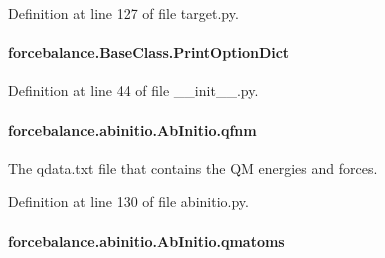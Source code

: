 Definition at line 127 of file target.\-py.

\hypertarget{classforcebalance_1_1BaseClass_afc6659278497d7245bc492ecf405ccae}{
\paragraph[{Print\-Option\-Dict}]{\setlength{\rightskip}{0pt plus 5cm}forcebalance.\-Base\-Class.\-Print\-Option\-Dict\hspace{0.3cm}{\ttfamily [inherited]}}}\label{classforcebalance_1_1BaseClass_afc6659278497d7245bc492ecf405ccae}


Definition at line 44 of file \-\_\-\-\_\-init\-\_\-\-\_\-.\-py.

\hypertarget{classforcebalance_1_1abinitio_1_1AbInitio_ac93db408472034937e79572bf872886c}{
\paragraph[{qfnm}]{\setlength{\rightskip}{0pt plus 5cm}forcebalance.\-abinitio.\-Ab\-Initio.\-qfnm}}\label{classforcebalance_1_1abinitio_1_1AbInitio_ac93db408472034937e79572bf872886c}


The qdata.\-txt file that contains the Q\-M energies and forces. 



Definition at line 130 of file abinitio.\-py.

\hypertarget{classforcebalance_1_1abinitio_1_1AbInitio_af0760b8d33ce9dd044ccbe68fba7a1be}{
\paragraph[{qmatoms}]{\setlength{\rightskip}{0pt plus 5cm}forcebalance.\-abinitio.\-Ab\-Initio.\-qmatoms}}\label{classforcebalance_1_1abinitio_1_1AbInitio_af0760b8d33ce9dd044ccbe68fba7a1be}


